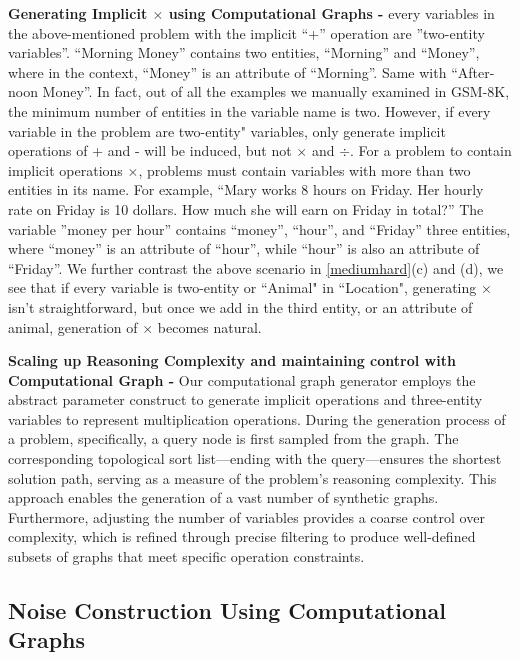 \textbf{Generating Implicit $\times$ using Computational Graphs -} every variables in the above-mentioned problem with the implicit ``+” operation are ”two-entity variables”. ``Morning Money” contains two entities, ``Morning” and ``Money”, where in the context,
``Money” is an attribute of ``Morning”. Same with ``After-
noon Money”. In fact, out of all the examples we manually examined in GSM-8K, the minimum number of entities in the variable name is two. However, if every variable in the problem are two-entity" variables, only generate implicit operations of + and - will be induced, but not $\times$ and $\div$. For a problem to contain implicit operations $\times$, problems must contain variables with more than two entities in its name. For example, ``Mary works 8 hours on Friday. Her hourly rate on
Friday is 10 dollars. How much she will earn on Friday
in total?” The variable ”money per hour” contains ``money”, ``hour”, and ``Friday” three entities, where
``money” is an attribute of ``hour”, while ``hour” is also an attribute of ``Friday”. We further contrast the above scenario in \cref{mediumhard}(c) and (d), we see that if every variable is two-entity or ``Animal" in ``Location", generating $\times$ isn't straightforward, but once we add in the third entity, or an attribute of animal, generation of $\times$ becomes natural. 

\textbf{Scaling up Reasoning Complexity and maintaining control with Computational Graph -} Our computational graph generator employs the abstract parameter construct to generate implicit operations and three-entity variables to represent multiplication operations. 
During the generation process of a problem, specifically, a query node is first sampled from the graph. The corresponding topological sort list—ending with the query—ensures the shortest solution path, serving as a measure of the problem's reasoning complexity. 
This approach enables the generation of a vast number of synthetic graphs. Furthermore, adjusting the number of variables provides a coarse control over complexity, which is refined through precise filtering to produce well-defined subsets of graphs that meet specific operation constraints.

\subsection{Noise Construction Using Computational Graphs} 
\label{sec:noisecontruction} 


